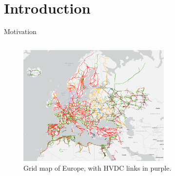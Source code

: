 \section{Introduction}

\begin{frame}{}
    \tableofcontents[currentsection]
\end{frame}

\begin{frame}{Motivation}
    \begin{columns}
        
        \begin{column}{0.99\textwidth}
            \begin{figure}[H]
                \centering
                \includegraphics[width=0.68\textwidth]{chapter5pics/hvdcMap.png}
                \caption{Grid map of Europe, with HVDC links in purple.}
                \label{fig:hvdcMap}
            \end{figure}
        \end{column}
    \end{columns}
\end{frame}



